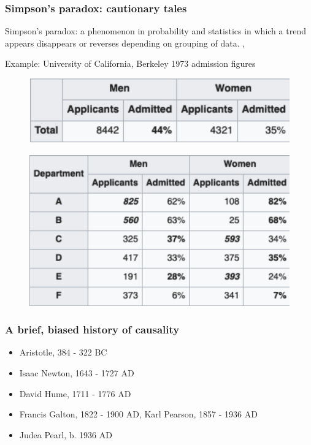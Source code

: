 \begin{frame}
    \frametitle{Simpson's paradox: cautionary tales}
    Simpson's paradox: a phenomenon in probability and statistics in which a trend appears disappears or reverses depending on grouping of data. \cite{simpson-wikipedia}, \cite{pearl2016causal} \newline
    
    Example: University of California, Berkeley 1973 admission figures\newline
    
    \begin{figure}[ht]
        \includegraphics[height=0.15\textheight]{graphics/berkeley}\newline
        \cite{freedman1998statistics}
    \end{figure}
    \begin{figure}[ht]
        \includegraphics[height=0.3\textheight]{graphics/berkeley_later}\newline
        \cite{Bickel398}
    \end{figure}
    
\end{frame}


\begin{frame}
\frametitle{A brief, biased history of causality}
\begin{itemize}
\item Aristotle, 384 - 322 BC
\item Isaac Newton, 1643 - 1727 AD
\item David Hume, 1711 - 1776 AD
\item Francis Galton, 1822 - 1900 AD, Karl Pearson, 1857 - 1936 AD
\item Judea Pearl, b. 1936 AD
\end{itemize}
\end{frame}


